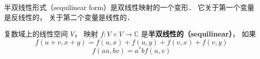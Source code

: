 
\begin{issues}
\issueDraft
\end{issues}

半双线性形式（sequilinear form）是双线性映射的一个变形． 它关于第一个变量是反线性的， 关于第二个变量是线性的．
\begin{definition}{}
复数域上的线性空间 $V$， 映射 $f:V\times V\to \mathbb C$ 是\textbf{半双线性的（sequilinear）}， 如果
\begin{equation}
f(u+v, x+y) = f(u,x) + f(u,y) + f(v,x) + f(v,y)
\end{equation}
\begin{equation}
f(au, bv) = a^* b f(u, v)
\end{equation}
\end{definition}
